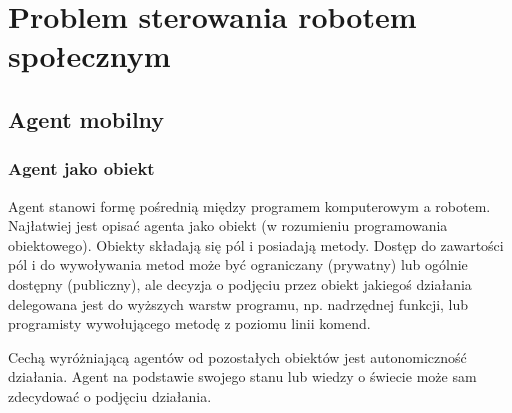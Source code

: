 \chapter{Problem sterowania robotem społecznym}

\section{Agent mobilny}




\subsection{Agent jako obiekt}

Agent stanowi formę pośrednią między programem komputerowym a robotem. Najłatwiej jest opisać agenta jako obiekt (w rozumieniu programowania obiektowego). Obiekty składają się pól i posiadają metody. Dostęp do zawartości pól i do wywoływania metod może być ograniczany (prywatny) lub ogólnie dostępny (publiczny), ale decyzja o podjęciu przez obiekt jakiegoś działania delegowana jest do wyższych warstw programu, np. nadrzędnej funkcji, lub programisty wywołującego metodę z poziomu linii komend. 

Cechą wyróżniającą agentów od pozostałych obiektów jest autonomiczność działania. Agent na podstawie swojego stanu lub wiedzy o świecie może sam zdecydować o podjęciu działania. 


